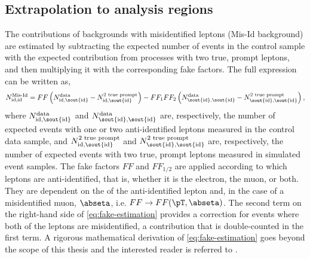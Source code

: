 \subsection{Extrapolation to analysis regions}
The contributions of backgrounds with misidentified leptons (Mis-Id background) are estimated by subtracting the  expected number of events in the control sample with the expected contribution from processes with two true, prompt leptons, and then multiplying it with the corresponding fake factors.
The full expression can be written as,
\begin{equation}
    \label{eq:fake-estimation}
    N_{\text{id,id}}^{\text{Mis-Id}} = FF \left( N_{\text{id,\sout{id}}}^{\text{data}} - N_{\text{id,\sout{id}}}^{\text{2 true prompt}} \right) - FF_1FF_2 \left( N_{\text{\sout{id},\sout{id}}}^{\text{data}} - N_{\text{\sout{id},\sout{id}}}^{\text{2 true prompt}} \right),
\end{equation}
where $N_{\text{id,\sout{id}}}^{\text{data}}$ and $N_{\text{\sout{id},\sout{id}}}^{\text{data}}$ are, respectively, the number of expected events with one or two anti-identified leptons measured in the control data sample, and $N_{\text{id,\sout{id}}}^{\text{2 true prompt}}$ and $N_{\text{\sout{id},\sout{id}}}^{\text{2 true prompt}}$ are, respectively, the number of expected events with two true, prompt leptons measured in simulated event samples.
The fake factors $FF$ and $FF_{1/2}$ are applied according to which leptons are anti-identified, that is, whether it is the electron, the muon, or both.
They are dependent on the \pT of the anti-identified lepton and, in the case of a misidentified muon, $\abseta$, i.e. $FF \to FF(\pT, \abseta)$.
The second term on the right-hand side of \cref{eq:fake-estimation} provides a correction for events where both of the leptons are misidentified, a contribution that is double-counted in the first term. A rigorous mathematical derivation of \cref{eq:fake-estimation} goes beyond the scope of this thesis and the interested reader is referred to .

